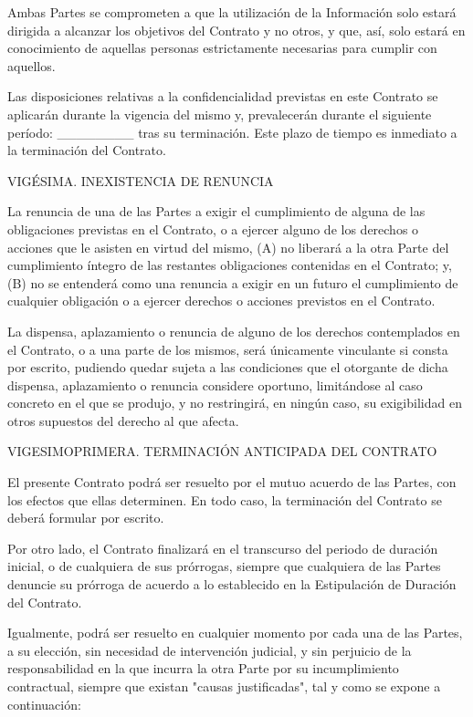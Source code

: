 \documentclass[a4paper,11pt]{report}
\begin{document}
	Ambas Partes se comprometen a que la utilización de la Información solo
	estará dirigida a alcanzar los objetivos del Contrato y no otros, y que,
	así, solo estará en conocimiento de aquellas personas estrictamente
	necesarias para cumplir con aquellos.
	
	Las disposiciones relativas a la confidencialidad previstas en este
	Contrato se aplicarán durante la vigencia del mismo y, prevalecerán
	durante el siguiente período: \_\_\_\_\_\_\_\_ tras su terminación. Este plazo
	de tiempo es inmediato a la terminación del Contrato.
	
	VIGÉSIMA. INEXISTENCIA DE RENUNCIA
	
	La renuncia de una de las Partes a exigir el cumplimiento de alguna de
	las obligaciones previstas en el Contrato, o a ejercer alguno de los
	derechos o acciones que le asisten en virtud del mismo, (A) no liberará
	a la otra Parte del cumplimiento íntegro de las restantes obligaciones
	contenidas en el Contrato; y, (B) no se entenderá como una renuncia a
	exigir en un futuro el cumplimiento de cualquier obligación o a ejercer
	derechos o acciones previstos en el Contrato.
	
	La dispensa, aplazamiento o renuncia de alguno de los derechos
	contemplados en el Contrato, o a una parte de los mismos, será
	únicamente vinculante si consta por escrito, pudiendo quedar sujeta a
	las condiciones que el otorgante de dicha dispensa, aplazamiento o
	renuncia considere oportuno, limitándose al caso concreto en el que se
	produjo, y no restringirá, en ningún caso, su exigibilidad en otros
	supuestos del derecho al que afecta.
	
	VIGESIMOPRIMERA. TERMINACIÓN ANTICIPADA DEL CONTRATO
	
	El presente Contrato podrá ser resuelto por el mutuo acuerdo de las
	Partes, con los efectos que ellas determinen. En todo caso, la
	terminación del Contrato se deberá formular por escrito.
	
	Por otro lado, el Contrato finalizará en el transcurso del periodo de
	duración inicial, o de cualquiera de sus prórrogas, siempre que
	cualquiera de las Partes denuncie su prórroga de acuerdo a lo
	establecido en la Estipulación de Duración del Contrato.
	
	Igualmente, podrá ser resuelto en cualquier momento por cada una de las
	Partes, a su elección, sin necesidad de intervención judicial, y sin
	perjuicio de la responsabilidad en la que incurra la otra Parte por su
	incumplimiento contractual, siempre que existan "causas justificadas",
	tal y como se expone a continuación:
	
\end{document}

